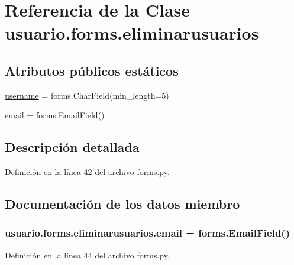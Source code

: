 \hypertarget{classusuario_1_1forms_1_1eliminarusuarios}{}\section{Referencia de la Clase usuario.\+forms.\+eliminarusuarios}
\label{classusuario_1_1forms_1_1eliminarusuarios}
\subsection*{Atributos públicos estáticos}
\begin{DoxyCompactItemize}
\item 
\hyperlink{classusuario_1_1forms_1_1eliminarusuarios_a11c4733a1499a690090fef31269bd828}{username} = forms.\+Char\+Field(min\+\_\+length=5)
\item 
\hyperlink{classusuario_1_1forms_1_1eliminarusuarios_a438ad14c23d4c78d1a5a559b17c55ed2}{email} = forms.\+Email\+Field()
\end{DoxyCompactItemize}


\subsection{Descripción detallada}


Definición en la línea 42 del archivo forms.\+py.



\subsection{Documentación de los datos miembro}
\subsubsection[{\texorpdfstring{email}{email}}]{\setlength{\rightskip}{0pt plus 5cm}usuario.\+forms.\+eliminarusuarios.\+email = forms.\+Email\+Field()\hspace{0.3cm}{\ttfamily [static]}}\hypertarget{classusuario_1_1forms_1_1eliminarusuarios_a438ad14c23d4c78d1a5a559b17c55ed2}{}\label{classusuario_1_1forms_1_1eliminarusuarios_a438ad14c23d4c78d1a5a559b17c55ed2}


Definición en la línea 44 del archivo forms.\+py.

